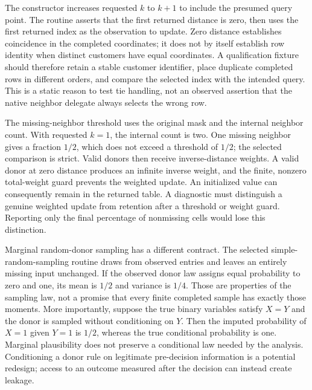 The constructor increases requested $k$ to $k+1$ to include the presumed query point. The routine asserts that the first returned distance is zero, then uses the first returned index as the observation to update. Zero distance establishes coincidence in the completed coordinates; it does not by itself establish row identity when distinct customers have equal coordinates. A qualification fixture should therefore retain a stable customer identifier, place duplicate completed rows in different orders, and compare the selected index with the intended query. This is a static reason to test tie handling, not an observed assertion that the native neighbor delegate always selects the wrong row.~\citep{exec25_otm_imputejl,exec25_otm_choice}

The missing-neighbor threshold uses the original mask and the internal neighbor count. With requested $k=1$, the internal count is two. One missing neighbor gives a fraction $1/2$, which does not exceed a threshold of $1/2$; the selected comparison is strict. Valid donors then receive inverse-distance weights. A valid donor at zero distance produces an infinite inverse weight, and the finite, nonzero total-weight guard prevents the weighted update. An initialized value can consequently remain in the returned table. A diagnostic must distinguish a genuine weighted update from retention after a threshold or weight guard. Reporting only the final percentage of nonmissing cells would lose this distinction.~\citep{exec25_otm_imputejl,exec25_otm_choice}

Marginal random-donor sampling has a different contract. The selected simple-random-sampling routine draws from observed entries and leaves an entirely missing input unchanged. If the observed donor law assigns equal probability to zero and one, its mean is $1/2$ and variance is $1/4$. Those are properties of the sampling law, not a promise that every finite completed sample has exactly those moments. More importantly, suppose the true binary variables satisfy $X=Y$ and the donor is sampled without conditioning on $Y$. Then the imputed probability of $X=1$ given $Y=1$ is $1/2$, whereas the true conditional probability is one. Marginal plausibility does not preserve a conditional law needed by the analysis. Conditioning a donor rule on legitimate pre-decision information is a potential redesign; access to an outcome measured after the decision can instead create leakage.~\citep{exec25_otm_imputejl,exec25_otm_choice}

